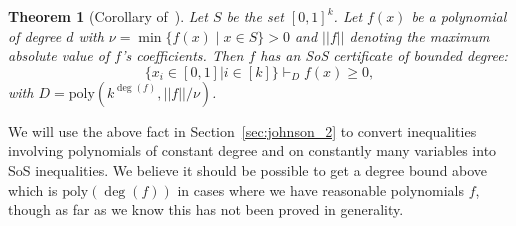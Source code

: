 \documentclass[11pt]{article}
\def \R {\mathbb{R}}
\def \Id {\mathrm{Id}}
\def \sos {SoS\xspace}
\def \poly {\mathrm{poly}}
\newtheorem{theorem}{Theorem}[section]
\newtheorem{claim}[theorem]{Claim}
\theoremstyle{definition}
\begin{document}
\begin{theorem}[Corollary of~\cite{schweighofer}]\label{thm:blackbox-sos}
Let $S$ be the set $[0,1]^k$. Let $f(x)$ be a polynomial of degree $d$ with $\nu = \min\{f(x) \mid x \in S\} > 0$ and $||f||$ denoting the maximum absolute value of $f$'s coefficients. Then $f$ has an \sos certificate of bounded degree:
\[\{x_i \in [0,1] | i \in [k]\} \vdash_D f(x) \geq 0,\]
with $D = \poly(k^{\deg(f)}, ||f||/\nu)$.
\end{theorem}

We will use the above fact in Section~\ref{sec:johnson_2} to convert inequalities involving polynomials of constant degree and on constantly many variables into \sos inequalities. We believe it should be possible to get a degree bound above which is $\poly(\deg(f))$ in cases where we have reasonable polynomials $f$, though as far as we know this has not been proved in generality.




\end{document}
